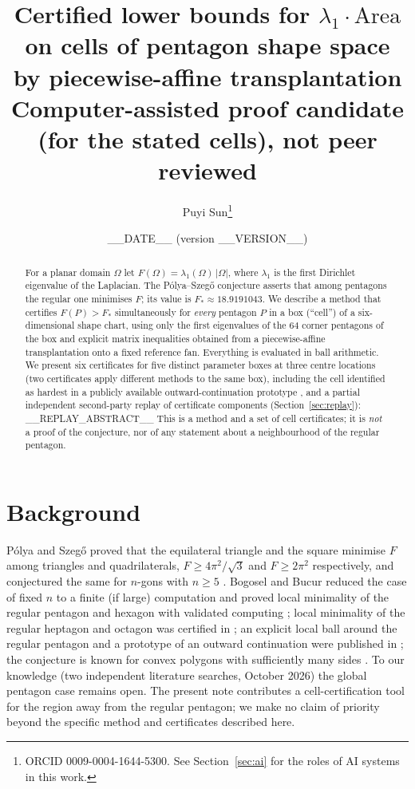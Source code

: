 \documentclass[11pt]{article}
\title{Certified lower bounds for $\lambda_1\cdot\mathrm{Area}$ on cells of pentagon shape space\\
by piecewise-affine transplantation\\[4pt]
\large Computer-assisted proof candidate (for the stated cells), not peer reviewed}
\author{Puyi Sun\thanks{ORCID 0009-0004-1644-5300. See Section~\ref{sec:ai} for the roles of AI systems in this work.}}
\date{__DATE__ \quad (version __VERSION__)}
\theoremstyle{remark}
\begin{document}
\maketitle

\begin{abstract}
For a planar domain $\Omega$ let $F(\Omega)=\lambda_1(\Omega)\,|\Omega|$, where $\lambda_1$ is the first Dirichlet
eigenvalue of the Laplacian. The P\'olya--Szeg\H{o} conjecture asserts that among pentagons the regular one minimises $F$;
its value is $F_*\approx 18.9191043$. We describe a method that certifies $F(P)>F_*$ simultaneously for \emph{every}
pentagon $P$ in a box (``cell'') of a six-dimensional shape chart, using only the first eigenvalues of the $64$ corner
pentagons of the box and explicit matrix inequalities obtained from a piecewise-affine transplantation onto a fixed
reference fan. Everything is evaluated in ball arithmetic. We present six certificates for five distinct parameter boxes
at three centre locations (two certificates apply different methods to the same box), including the cell identified as
hardest in a publicly available outward-continuation prototype \cite{liu}, and a partial independent second-party replay
of certificate components (Section~\ref{sec:replay}): __REPLAY_ABSTRACT__ This is a method and a set of cell certificates; it is \emph{not} a proof of
the conjecture, nor of any statement about a neighbourhood of the regular pentagon.
\end{abstract}

\section{Background}
P\'olya and Szeg\H{o} proved that the equilateral triangle and the square minimise $F$ among triangles and
quadrilaterals, $F\ge 4\pi^2/\sqrt3$ and $F\ge 2\pi^2$ respectively, and conjectured the same for $n$-gons with
$n\ge5$ \cite{ps}. Bogosel and Bucur reduced the case of fixed $n$ to a finite (if large) computation and proved local
minimality of the regular pentagon and hexagon with validated computing \cite{bb-jep,bb-val}; local minimality of the
regular heptagon and octagon was certified in \cite{ep}; an explicit local ball around the regular pentagon and a
prototype of an outward continuation were published in \cite{liu}; the conjecture is known for convex polygons with
sufficiently many sides \cite{cghl}. To our knowledge (two independent literature searches, October 2026) the global
pentagon case remains open. The present note contributes a cell-certification tool for the region away from the
regular pentagon; we make no claim of priority beyond the specific method and certificates described here.
\end{document}

